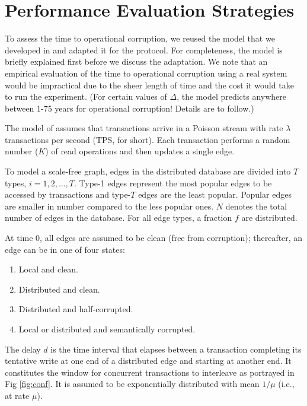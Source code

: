 \section{Performance Evaluation Strategies}
\label{sec:modeling}

To assess the time to operational corruption, we reused the model that we developed in \cite{Ezhilchelvan2018} and adapted it for the \tDelta protocol.
For completeness, the model is briefly explained first before we discuss the adaptation.
We note that an empirical evaluation of the time to operational corruption using a real system would be impractical due to the sheer length of time and the cost it would take to run the experiment.
(For certain values of $\Delta$, the model predicts anywhere between 1-75 years for operational corruption! Details are to follow.)

The model of \cite{Ezhilchelvan2018} assumes that transactions arrive in a Poisson stream with rate $\lambda$ transactions per second (TPS, for short).
Each transaction performs a random number ($K$) of read operations and then updates a single edge.

To model a scale-free graph, edges in the distributed database are divided into $T$ types, $i = 1, 2, \ldots, T$.
Type-1 edges represent the most popular edges to be accessed by transactions and type-$T$ edges are the least popular. Popular edges are smaller in number compared to the less popular ones.
$N$ denotes the total number of edges in the database.
For all edge types, a fraction $f$ are distributed.

At time $0$, all edges are assumed to be clean (free from corruption); thereafter, an edge can be in one of four states:
\begin{enumerate}
\item Local and clean.
\item Distributed and clean.
\item Distributed and half-corrupted.
\item Local or distributed and semantically corrupted.
\end{enumerate}

The delay $d$ is the time interval that elapses between a transaction completing its tentative write at one end of a distributed edge and starting at another end. It constitutes the window for concurrent transactions to interleave as portrayed in Fig \ref{fig:conf}. It is assumed to be exponentially distributed with mean $ 1/ \mu$ (i.e., at rate $\mu$).

